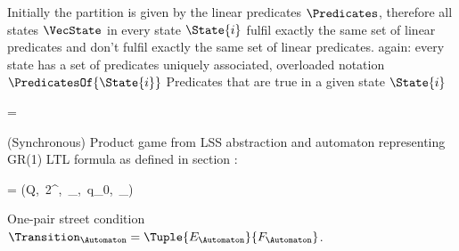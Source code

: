 Initially the partition is given by the linear predicates $\Predicates$, therefore all states $\VecState$ in every state $\State{i}$ fulfil exactly the same set of linear predicates and don't fulfil exactly the same set of linear predicates.
again: every state has a set of predicates uniquely associated, overloaded notation $\PredicatesOf{\State{i}}$
Predicates that are true in a given state $\State{i}$

\startformula
     = 
\stopformula

(Synchronous) Product game from LSS abstraction and automaton representing GR(1) LTL formula as defined in section :

\startformula
    \Automaton = (Q,\, 2^\Predicates,\, \Transition_\Automaton,\, q_0,\, \Condition_\Automaton) \EndPeriod
\stopformula

One-pair street condition $\Transition_\Automaton = \Tuple{E_\Automaton}{F_\Automaton}$.

